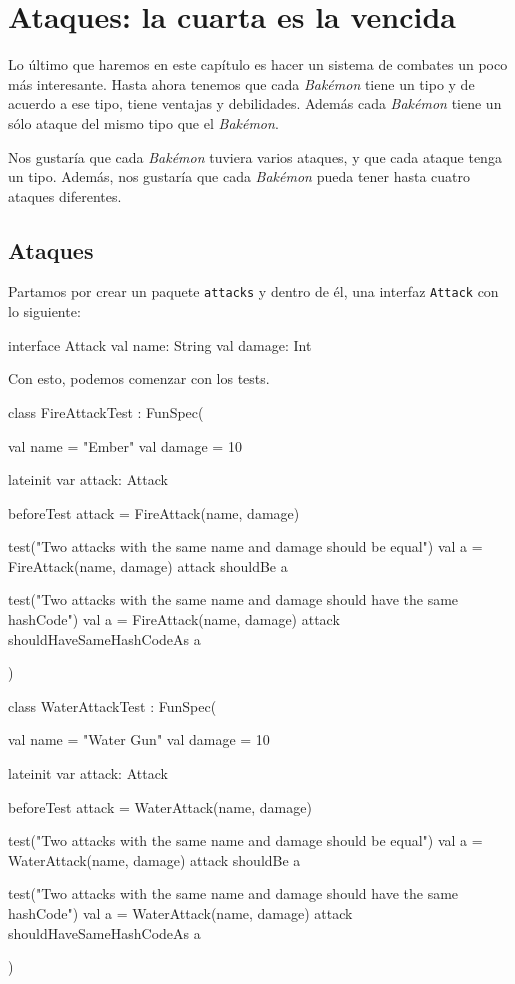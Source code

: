 \section{Ataques: la cuarta es la vencida}
  \label{sec:ataques-4}

  Lo último que haremos en este capítulo es hacer un sistema de combates un poco más interesante.
  Hasta ahora tenemos que cada \textit{Bakémon} tiene un tipo y de acuerdo a ese tipo, tiene 
  ventajas y debilidades.
  Además cada \textit{Bakémon} tiene un sólo ataque del mismo tipo que el \textit{Bakémon}.

  Nos gustaría que cada \textit{Bakémon} tuviera varios ataques, y que cada ataque tenga un tipo.
  Además, nos gustaría que cada \textit{Bakémon} pueda tener hasta cuatro ataques diferentes.

  \subsection{Ataques}
    Partamos por crear un paquete \texttt{attacks} y dentro de él, una interfaz \texttt{Attack} con
    lo siguiente:

    \begin{kotlin}
      interface Attack {
        val name: String
        val damage: Int
      }
    \end{kotlin}

    Con esto, podemos comenzar con los tests.

    \begin{kotlin}
      class FireAttackTest : FunSpec({
        val name = "Ember"
        val damage = 10

        lateinit var attack: Attack

        beforeTest {
          attack = FireAttack(name, damage)
        }

        test("Two attacks with the same name and damage should be equal") {
          val a = FireAttack(name, damage)
          attack shouldBe a
        }
        
        test("Two attacks with the same name and damage should have the same hashCode") {
          val a = FireAttack(name, damage)
          attack shouldHaveSameHashCodeAs a
        }
      })
    \end{kotlin}

    \begin{kotlin}
      class WaterAttackTest : FunSpec({
        val name = "Water Gun"
        val damage = 10

        lateinit var attack: Attack

        beforeTest {
          attack = WaterAttack(name, damage)
        }

        test("Two attacks with the same name and damage should be equal") {
          val a = WaterAttack(name, damage)
          attack shouldBe a
        }

        test("Two attacks with the same name and damage should have the same hashCode") {
          val a = WaterAttack(name, damage)
          attack shouldHaveSameHashCodeAs a
        }
      })
    \end{kotlin}


